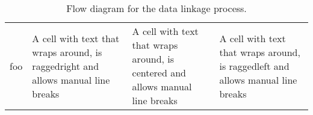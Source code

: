 \documentclass{article}
\begin{document}

\begin{table} %
	\begin{tabular}{| c | L{4cm} | C{3cm} | R{3cm} |}
		foo &
		A cell with text that wraps around, is raggedright and allows \newline
		    manual line breaks &
		A cell with text that wraps around, is centered and allows \newline
		    manual line breaks &
		A cell with text that wraps around, is raggedleft and allows \newline
		    manual line breaks \\

	\end{tabular}
	\caption{Flow diagram for the data linkage process.}
\end{table}
\end{document}
